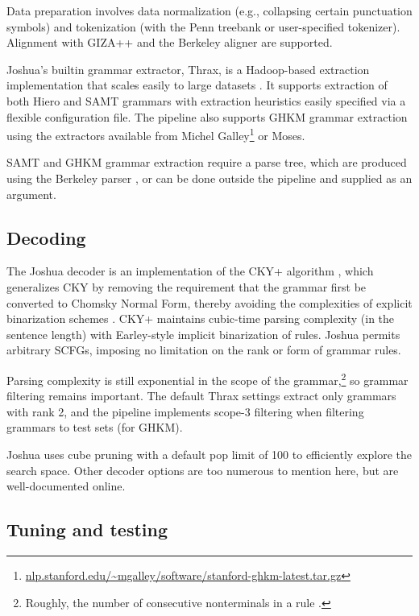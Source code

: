 \documentclass[11pt]{article}
\begin{document}
Data preparation involves data normalization (e.g., collapsing certain
punctuation symbols) and tokenization (with the Penn treebank or
user-specified tokenizer).  Alignment with GIZA++ \cite{giza} and the
Berkeley aligner \cite{berkeley-aligner} are supported.

Joshua's builtin grammar extractor, Thrax, is a Hadoop-based
extraction implementation that scales easily to large
datasets \cite{PPDB}.  It supports extraction of both Hiero
\cite{Chiang2005} and SAMT grammars \cite{samt2006} with extraction
heuristics easily specified via a flexible configuration file. The
pipeline also supports GHKM grammar extraction
\cite{galley2006scalable} using the extractors available from Michel
Galley\footnote{\url{nlp.stanford.edu/~mgalley/software/stanford-ghkm-latest.tar.gz}}
or Moses.

SAMT and GHKM grammar extraction require a parse tree, which are
produced using the Berkeley parser \cite{petrov2006learning}, or can
be done outside the pipeline and supplied as an argument.

\subsection{Decoding}

The Joshua decoder is an implementation of the CKY+ algorithm
\cite{chappelier1998generalized}, which generalizes CKY by removing
the requirement that the grammar first be converted to Chomsky Normal
Form, thereby avoiding the complexities of explicit binarization
schemes \cite{zhang2006synchronous,denero2009asynchronous}. CKY+
maintains cubic-time parsing complexity (in the sentence length) with
Earley-style implicit binarization of rules. Joshua permits arbitrary
SCFGs, imposing no limitation on the rank or form of grammar rules.

Parsing complexity is still exponential in the scope of the
grammar,\footnote{Roughly, the number of consecutive nonterminals in a
  rule \cite{hopkins2010scfg}.} so grammar filtering remains
important.  The default Thrax settings extract only grammars with rank
2, and the pipeline implements scope-3 filtering \cite{hopkins2010scfg}
when filtering grammars to test sets (for GHKM).

Joshua uses cube pruning \cite{Chiang2007} with a default pop limit of
100 to efficiently explore the search space. Other decoder options are
too numerous to mention here, but are well-documented online.

\subsection{Tuning and testing}
\end{document}
